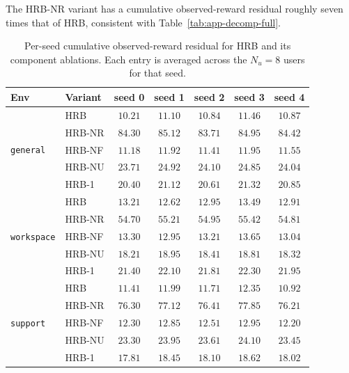\documentclass{article} %
\begin{document}
The \textnormal{HRB-NR} variant has a cumulative observed-reward residual
roughly seven times that of \textnormal{HRB}, consistent with
Table~\ref{tab:app-decomp-full}.

\begin{table}[h]
\centering
\small
\caption{Per-seed cumulative observed-reward residual for HRB and its component ablations. Each
entry is averaged across the \(N_u=8\) users for that seed.}
\label{tab:app-regret-abl}
\begin{tabular}{llccccc}
\toprule
Env & Variant & seed 0 & seed 1 & seed 2 & seed 3 & seed 4 \\
\midrule
\multirow{5}{*}{\texttt{general}}
 & \textnormal{HRB}                & $10.21$ & $11.10$ & $10.84$ & $11.46$ & $10.87$ \\
 & \textnormal{HRB-NR}         & $84.30$ & $85.12$ & $83.71$ & $84.95$ & $84.42$ \\
 & \textnormal{HRB-NF}      & $11.18$ & $11.92$ & $11.41$ & $11.95$ & $11.55$ \\
 & \textnormal{HRB-NU} & $23.71$ & $24.92$ & $24.10$ & $24.85$ & $24.04$ \\
 & \textnormal{HRB-1}         & $20.40$ & $21.12$ & $20.61$ & $21.32$ & $20.85$ \\
\midrule
\multirow{5}{*}{\texttt{workspace}}
 & \textnormal{HRB}                & $13.21$ & $12.62$ & $12.95$ & $13.49$ & $12.91$ \\
 & \textnormal{HRB-NR}         & $54.70$ & $55.21$ & $54.95$ & $55.42$ & $54.81$ \\
 & \textnormal{HRB-NF}      & $13.30$ & $12.95$ & $13.21$ & $13.65$ & $13.04$ \\
 & \textnormal{HRB-NU} & $18.21$ & $18.95$ & $18.41$ & $18.81$ & $18.32$ \\
 & \textnormal{HRB-1}         & $21.40$ & $22.10$ & $21.81$ & $22.30$ & $21.95$ \\
\midrule
\multirow{5}{*}{\texttt{support}}
 & \textnormal{HRB}                & $11.41$ & $11.99$ & $11.71$ & $12.35$ & $10.92$ \\
 & \textnormal{HRB-NR}         & $76.30$ & $77.12$ & $76.41$ & $77.85$ & $76.21$ \\
 & \textnormal{HRB-NF}      & $12.30$ & $12.85$ & $12.51$ & $12.95$ & $12.20$ \\
 & \textnormal{HRB-NU} & $23.30$ & $23.95$ & $23.61$ & $24.10$ & $23.45$ \\
 & \textnormal{HRB-1}         & $17.81$ & $18.45$ & $18.10$ & $18.62$ & $18.02$ \\
\bottomrule
\end{tabular}

\end{table}
\end{document}
